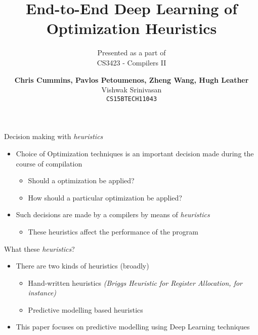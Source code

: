 \documentclass[10pt]{beamer}
\title[E2E DL of Opt Heuristics]{End-to-End Deep Learning of Optimization Heuristics}
\subtitle{Presented as a part of \\
CS3423 - Compilers II}
\author[Chris Cummins \textit{et al}]{\textbf{Chris Cummins, Pavlos Petoumenos, Zheng Wang, Hugh Leather}\\
\vspace{10mm}
Vishwak Srinivasan\\
\texttt{CS15BTECH11043}}
\begin{document}
\begin{frame}
\titlepage
\end{frame}

\begin{frame}{Decision making with \emph{heuristics}}
\begin{itemize}
\item<1->{Choice of Optimization techniques is an important decision made during the course of compilation
          \begin{itemize}
          \item<2->{Should a optimization be applied?}
          \item<3->{How should a particular optimization be applied?}
          \end{itemize}}
\item<4->{Such decisions are made by a compilers by means of \emph{heuristics}
          \begin{itemize}
          \item<5->{These heuristics affect the performance of the program}
          \end{itemize}}
\end{itemize}
\end{frame}

\begin{frame}{What these \emph{heuristics}?}
\begin{itemize}
\item{There are two kinds of heuristics (broadly)
      \begin{itemize}
      \item<1->{Hand-written heuristics \textit{(Briggs Heuristic for Register Allocation, for instance)}}
      \item<2->{Predictive modelling based heuristics}
      \end{itemize}}
\item<3->{This paper focuses on predictive modelling using Deep Learning techniques}
\end{itemize}
\end{frame}
\end{document}
